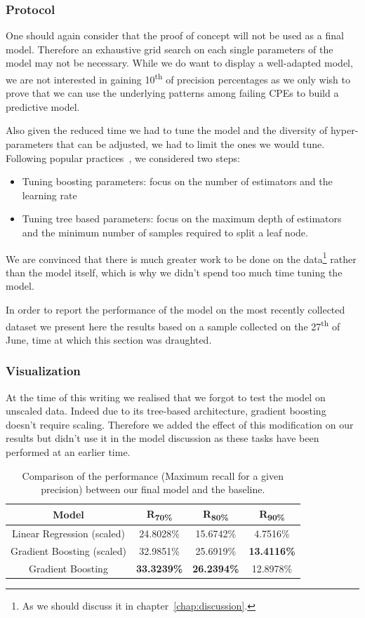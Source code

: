 \subsubsection{Protocol}
One should again consider that the proof of concept will not be used as a final model. Therefore an exhaustive grid search on each single parameters of the model may not be necessary. While we do want to display a well-adapted model, we are not interested in gaining 10\textsuperscript{th} of precision percentages as we only wish to prove that we can use the underlying patterns among failing CPEs to build a predictive model.

Also given the reduced time we had to tune the model and the diversity of hyper-parameters that can be adjusted, we had to limit the ones we would tune. Following popular practices~\cite{tuningGB}, we considered two steps:
\begin{itemize}
\item Tuning boosting parameters: focus on the number of estimators and the learning rate
\item Tuning tree based parameters: focus on the maximum depth of estimators and the minimum number of samples required to split a leaf node.
\end{itemize}
We are convinced that there is much greater work to be done on the data\footnote{As we should discuss it in chapter~\ref{chap:discussion}.} rather than the model itself, which is why we didn't spend too much time tuning the model. 

In order to report the performance of the model on the most recently collected dataset we present here the results based on a sample collected on the 27\textsuperscript{th} of June, time at which this section was draughted.

\subsubsection{Visualization}
At the time of this writing we realised that we forgot to test the model on unscaled data. Indeed due to its tree-based architecture, gradient boosting doesn't require scaling. Therefore we added the effect of this modification on our results but didn't use it in the model discussion as these tasks have been performed at an earlier time. 

\begin{table}[h]
\begin{center}
\begin{tabular}{c c c c }
\hline
\textbf{Model} & \textbf{R\textsubscript{70\%}} & \textbf{R\textsubscript{80\%}}& \textbf{R\textsubscript{90\%}}\\ 
\hline\hline
Linear Regression (scaled) & 24.8028\% & 15.6742\% & 4.7516\%  \\
Gradient Boosting (scaled) & 32.9851\% & 25.6919\% & \textbf{13.4116\%} \\
Gradient Boosting  &  \textbf{33.3239\%} & \textbf{26.2394\%} & 12.8978\%
\end{tabular}
\end{center}
\caption{\label{rec_models}Comparison of the performance (Maximum recall for a given precision) between our final model and the baseline.}
\end{table}

